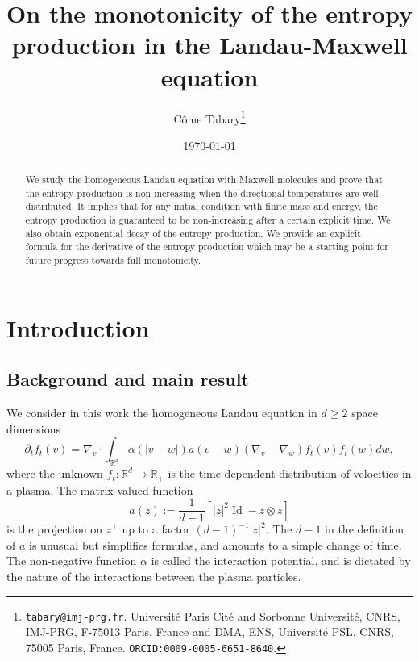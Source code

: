 \documentclass[11pt,a4paper]{article}
\title{On the monotonicity of the entropy production in the Landau-Maxwell equation}
\date{\today}
\author{Côme Tabary\footnote{\texttt{tabary@imj-prg.fr}. Université Paris Cité and Sorbonne Université, CNRS, IMJ-PRG, F-75013 Paris, France and DMA, ENS, Université PSL, CNRS, 75005 Paris, France. \texttt{ORCID:0009-0005-6651-8640}. }}
\theoremstyle{definition}
\theoremstyle{plain}
\DeclareMathOperator*{\Id}{Id}
\begin{document}
\maketitle

\begin{abstract}
\noindent We study the homogeneous Landau equation with Maxwell molecules and prove that the entropy production is non-increasing when the directional temperatures are well-distributed. It implies that for any initial condition with finite mass and energy, the entropy production is guaranteed to be non-increasing after a certain explicit time. We also obtain exponential decay of the entropy production. We provide an explicit formula for the derivative of the entropy production which may be a starting point for future progress towards full monotonicity.
\end{abstract}






\section{Introduction}

\subsection{Background and main result}

We consider in this work the homogeneous Landau equation in $d\geq 2$ space dimensions
\begin{equation}
\label{eq:landau}
    \partial_t f_t(v) = \nabla_v \cdot \int_{\mathbb{R}^d} \alpha(\vert v-w \vert) a (v - w) (\nabla_v - \nabla_w) f_t(v)f_t(w) dw,
\end{equation}
where the unknown $f_t:\mathbb{R}^d\rightarrow\mathbb{R}_+$ is the time-dependent distribution of velocities in a plasma.
The matrix-valued function
$$a(z):=\frac{1}{d-1}\left[\vert z \vert^2 \Id - z \otimes z\right]$$
is the projection on $z^{\perp}$ up to a factor $(d-1)^{-1}\vert z \vert^2$. The $d-1$ in the definition of $a$ is unusual but simplifies formulas, and amounts to a simple change of time. The non-negative function $\alpha$ is called the interaction potential, and is dictated by the nature of the interactions between the plasma particles.
\end{document}
